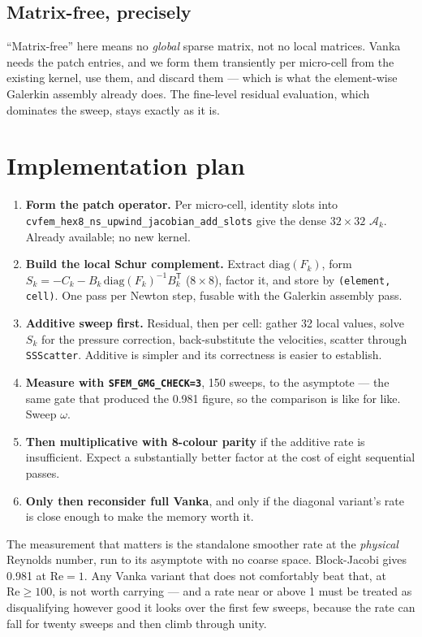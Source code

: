 \documentclass[11pt,a4paper]{article}
\newcommand{\code}[1]{\texttt{\small #1}}
\newcommand{\Rey}{\mathrm{Re}}
\begin{document}
\subsection{Matrix-free, precisely}
``Matrix-free'' here means no \emph{global} sparse matrix, not no local matrices. Vanka needs
the patch entries, and we form them transiently per micro-cell from the existing kernel, use
them, and discard them --- which is what the element-wise Galerkin assembly already does. The
fine-level residual evaluation, which dominates the sweep, stays exactly as it is.

\section{Implementation plan}

\begin{enumerate}[leftmargin=*]
\item \textbf{Form the patch operator.} Per micro-cell, identity slots into
\code{cvfem\_hex8\_ns\_upwind\_jacobian\_add\_slots} give the dense $32\times32$
$\mathcal{A}_k$. Already available; no new kernel.
\item \textbf{Build the local Schur complement.} Extract $\mathrm{diag}(F_k)$, form
$S_k = -C_k - B_k\,\mathrm{diag}(F_k)^{-1}B_k^{\mathsf T}$ ($8\times8$), factor it, and store
by \code{(element, cell)}. One pass per Newton step, fusable with the Galerkin assembly pass.
\item \textbf{Additive sweep first.} Residual, then per cell: gather 32 local values, solve
$S_k$ for the pressure correction, back-substitute the velocities, scatter through
\code{SSScatter}. Additive is simpler and its correctness is easier to establish.
\item \textbf{Measure with \code{SFEM\_GMG\_CHECK=3}}, 150 sweeps, to the asymptote --- the same
gate that produced the 0.981 figure, so the comparison is like for like. Sweep $\omega$.
\item \textbf{Then multiplicative with 8-colour parity} if the additive rate is insufficient.
Expect a substantially better factor at the cost of eight sequential passes.
\item \textbf{Only then reconsider full Vanka}, and only if the diagonal variant's rate is
close enough to make the memory worth it.
\end{enumerate}

\begin{tcolorbox}[colback=blue!4,colframe=blue!50!black,title=\bfseries Acceptance criterion]
The measurement that matters is the standalone smoother rate at the \emph{physical} Reynolds
number, run to its asymptote with no coarse space. Block-Jacobi gives 0.981 at $\Rey=1$. Any
Vanka variant that does not comfortably beat that, at $\Rey \ge 100$, is not worth carrying ---
and a rate near or above 1 must be treated as disqualifying however good it looks over the
first few sweeps, because the rate can fall for twenty sweeps and then climb through unity.
\end{tcolorbox}
\end{document}
